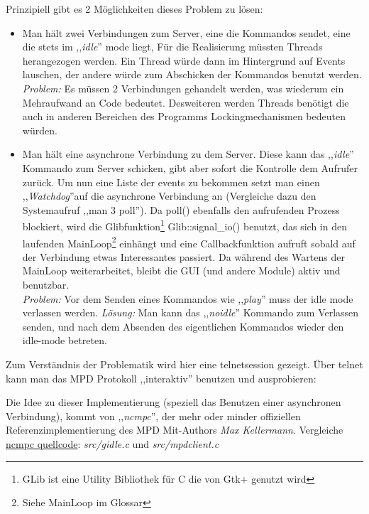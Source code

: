 Prinzipiell gibt es 2 Möglichkeiten dieses Problem zu lösen:
\begin{itemize}
    \item Man hält zwei Verbindungen zum Server, eine die Kommandos sendet, eine die stets im ,,\textit{idle}'' mode liegt,
        Für die Realisierung müssten Threads herangezogen werden. Ein Thread würde dann im Hintergrund auf Events lauschen,
        der andere würde zum Abschicken der Kommandos benutzt werden.
        \emph{Problem:} Es müssen 2 Verbindungen gehandelt werden, was wiederum ein Mehraufwand an Code bedeutet.
        Desweiteren werden Threads benötigt die auch in anderen Bereichen des Programms Lockingmechanismen bedeuten würden.
    \item Man hält eine asynchrone Verbindung zu dem Server.
        Diese kann das ,,\textit{idle}'' Kommando zum Server schicken, gibt aber sofort die Kontrolle dem Aufrufer zurück. Um nun eine Liste der events zu bekommen setzt man 
        einen ,,\textit{Watchdog}''auf die asynchrone Verbindung an (Vergleiche dazu den Systemaufruf ,,man 3 poll'').
        Da poll() ebenfalls den aufrufenden Prozess blockiert, wird die Glibfunktion\footnote{GLib ist eine Utility Bibliothek für C die von Gtk+ genutzt wird} Glib::signal\_io() benutzt, das sich in den laufenden MainLoop\footnote{Siehe MainLoop im Glossar} einhängt und eine 
        Callbackfunktion aufruft sobald auf der Verbindung etwas Interessantes passiert. Da während des Wartens der MainLoop
        weiterarbeitet, bleibt die GUI (und andere Module) aktiv und benutzbar.
        \\
        \emph{Problem:} Vor dem Senden eines Kommandos wie ,,\textit{play}'' muss der idle mode verlassen werden.
        \emph{Lösung:} Man kann das ,,\textit{noidle}'' Kommando zum Verlassen senden, und nach dem Absenden des eigentlichen Kommandos wieder den idle-mode betreten.
\end{itemize}

Zum Verständnis der Problematik wird hier eine telnetsession gezeigt. 
Über telnet kann man das MPD Protokoll ,,interaktiv'' benutzen und ausprobieren: 


Die Idee zu dieser Implementierung (speziell das Benutzen einer asynchronen Verbindung), kommt von ,,\textit{ncmpc}'',
der mehr oder minder offiziellen Referenzimplementierung des MPD Mit-Authors \emph{Max Kellermann}.
Vergleiche \href{http://mpd.wikia.com/wiki/Client:Ncmpc}{ncmpc quellcode}: \textit{src/gidle.c} und \textit{src/mpdclient.c}



